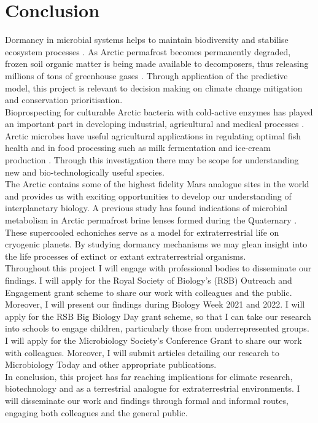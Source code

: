 \chapter{Conclusion}

\noindent Dormancy in microbial systems helps to maintain biodiversity and stabilise ecosystem processes \cite{JayT.Lennon2011Msbt}. As Arctic permafrost becomes permanently degraded,  frozen soil organic matter is being made available to decomposers, thus releasing millions of tons of greenhouse gases \cite{JahnMarkus2010Gcca}. Through application of the predictive model, this project is relevant to decision making on climate change mitigation and conservation prioritisation. \\

\noindent Bioprospecting for culturable Arctic bacteria with cold-active enzymes has played an important part in developing industrial, agricultural and medical processes \cite{srinivas2009bacterial}. Arctic microbes have useful agricultural applications in regulating optimal fish health \cite{HamiltonErinF2019AACM} and in food processing such as milk fermentation and ice-cream production \cite{cid2016properties}. Through this investigation there may be scope for understanding new and bio-technologically useful species. \\

\noindent The Arctic contains some of the highest fidelity Mars analogue sites in the world \cite{pollard2009overview} and provides us with exciting opportunities to develop our understanding of interplanetary biology. A previous study has found indications of microbial metabolism in Arctic permafrost brine lenses formed during the Quaternary \cite{GilichinskyD2003Swbw}. These supercooled echoniches serve as a model for extraterrestrial life on cryogenic planets. By studying dormancy mechanisms we may glean insight into the life processes of extinct or extant extraterrestrial organisms. \\

\noindent Throughout this project I will engage with professional bodies to disseminate our findings. I will apply for the Royal Society of Biology's (RSB) Outreach and Engagement grant scheme to share our work with colleagues and the public. Moreover, I will present our findings during Biology Week 2021 and 2022. I will apply for the RSB Big Biology Day grant scheme, so that I can take our research into schools to engage children, particularly those from underrepresented groups. I will apply for the Microbiology Society's Conference Grant to share our work with colleagues. Moreover, I will submit articles detailing our research to Microbiology Today and other appropriate publications.\\

\noindent In conclusion, this project has far reaching implications for climate research, biotechnology and as a terrestrial analogue for extraterrestrial environments. I will disseminate our work and findings through formal and informal routes, engaging both colleagues and the general public. 